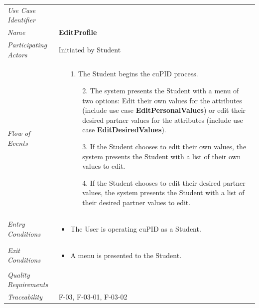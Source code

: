 \documentclass[12pt,letterpaper]{article}
\begin{document}
\begin{center}
	\begin{tabu} to 
		\toprule
		Use Case Identifier & \editprofile{} \\
		Name & {\bf EditProfile} \\
		Participating Actors & Initiated by Student \\
		Flow of Events & 
		\begin{minipage}[t]{\linewidth}
		    \begin{enumerate}
		    		\item[1.] The Student begins the cuPID process.
		    		\begin{enumerate}
			    		\item[2.] The system presents the Student with a menu of two options: Edit their own values for the attributes (include use case \textbf{EditPersonalValues}) or edit their desired partner values for the attributes (include use case \textbf{EditDesiredValues}).
				    \item[3.] If the Student chooses to edit their own values, the system presents the Student with a list of their own values to edit.
				    \item[4.] If the Student chooses to edit their desired partner values, the system presents the Student with a list of their desired partner values to edit.
		    		\end{enumerate}
			\end{enumerate}
		\end{minipage} \\

		Entry Conditions &
		\begin{minipage}[t]{\linewidth}
			\begin{itemize}
			    \item The User is operating cuPID as a Student.
	        \end{itemize}
		\end{minipage} \\

		Exit Conditions &
		\begin{minipage}[t]{\linewidth}
			\begin{itemize}
			    \item A menu is presented to the Student.
	        \end{itemize}
		\end{minipage} \\

		Quality Requirements & \\

		Traceability &  F-03, F-03-01, F-03-02 \\
		\toprule
	\end{tabu}
\end{center}
\end{document}
